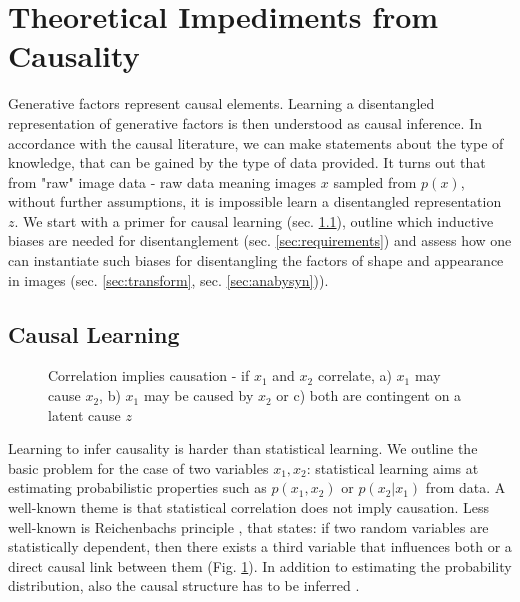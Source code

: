 \section{Theoretical Impediments from Causality}\label{sec:causality}
	Generative factors represent causal elements.
	Learning a disentangled representation of generative factors is then understood as causal inference.
	In accordance with the causal literature, we can make statements about the type of knowledge, that can be gained by the type of data provided. It turns out that from "raw" image data - raw data meaning images $x$ sampled from $p(x)$, without further assumptions, it is impossible learn a disentangled representation $z$. We start with a primer for causal learning (sec. \ref{sec:causallearning}), outline which inductive biases are needed for disentanglement (sec. \ref{sec:requirements}) and assess how one can instantiate such biases for disentangling the factors of shape and appearance in images (sec. \ref{sec:transform}, sec. \ref{sec:anabysyn})).

	\subsection{Causal Learning}\label{sec:causallearning}
		\begin{figure}[t]
			\begin{subfigure}{0.3\linewidth}
				\centering
				
				\caption{}
			\end{subfigure}
			\begin{subfigure}{0.3\linewidth}
				\centering
				
				\caption{}
			\end{subfigure}
			\begin{subfigure}{0.3\linewidth}
				\centering
				
				\caption{}
			\end{subfigure}
			\caption{Correlation implies causation - if $x_1$ and $x_2$ correlate, a) $x_1$ may cause $x_2$,  b) $x_1$ may be caused by $x_2$ or c) both are contingent on a latent cause $z$}
			\label{fig:reichenbach}
		\end{figure}

		Learning to infer causality is harder than statistical learning. We outline the basic problem for the case of two variables $x_1, x_2$: statistical learning aims at estimating probabilistic properties such as $p(x_1, x_2)$ or  $p(x_2|x_1)$ from data.
		A well-known theme is that statistical correlation does not imply causation. Less well-known is Reichenbachs principle \cite{peters17elements, reichenbach56time}, that states: if two random variables are statistically dependent, then there exists a third variable that influences both or a direct causal link between them (Fig. \ref{fig:reichenbach}).
		In addition to estimating the probability distribution, also the causal structure has to be inferred \cite{peters17elements}.

